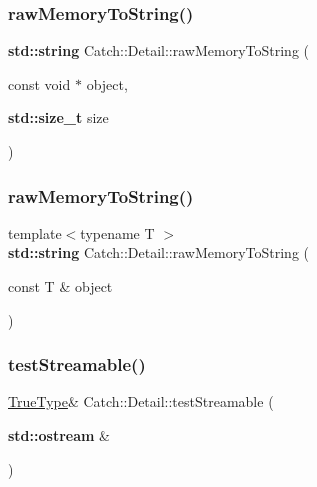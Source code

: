 \mbox{\label{namespace_catch_1_1_detail_ac5d6c510e565ee5bddcc2236194ce29e}} 
\subsubsection{\texorpdfstring{raw\+Memory\+To\+String()}{rawMemoryToString()}\hspace{0.1cm}{\footnotesize\ttfamily [1/2]}}
{\footnotesize\ttfamily \textbf{ std\+::string} Catch\+::\+Detail\+::raw\+Memory\+To\+String (\begin{DoxyParamCaption}\item[{const void $\ast$}]{object,  }\item[{\textbf{ std\+::size\+\_\+t}}]{size }\end{DoxyParamCaption})}

\mbox{\label{namespace_catch_1_1_detail_a371620ed524abfcae5c3772bf49b563a}} 
\subsubsection{\texorpdfstring{raw\+Memory\+To\+String()}{rawMemoryToString()}\hspace{0.1cm}{\footnotesize\ttfamily [2/2]}}
{\footnotesize\ttfamily template$<$typename T $>$ \\
\textbf{ std\+::string} Catch\+::\+Detail\+::raw\+Memory\+To\+String (\begin{DoxyParamCaption}\item[{const T \&}]{object }\end{DoxyParamCaption})\hspace{0.3cm}{\ttfamily [inline]}}

\mbox{\label{namespace_catch_1_1_detail_aff0ca0f561ad8053654ab27d54486197}} 
\subsubsection{\texorpdfstring{test\+Streamable()}{testStreamable()}\hspace{0.1cm}{\footnotesize\ttfamily [1/2]}}
{\footnotesize\ttfamily \hyperlink{struct_catch_1_1_detail_1_1_true_type}{True\+Type}\& Catch\+::\+Detail\+::test\+Streamable (\begin{DoxyParamCaption}\item[{\textbf{ std\+::ostream} \&}]{ }\end{DoxyParamCaption})}

